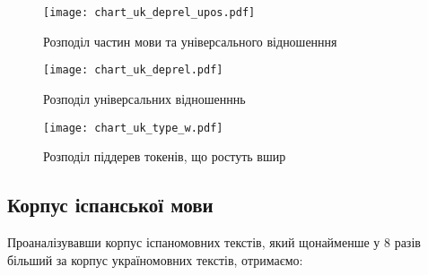 \begin{figure}[ht]
  \begin{center}
    \texttt{[image: chart\_uk\_deprel\_upos.pdf]}
  \end{center}
  \caption{Розподіл частин мови та універсального відношенння}
  \label{img:uk_deprel_upos}
\end{figure}

\newpage

\begin{multicols}{2}
\begin{figure}[H]
  \begin{center}
    \texttt{[image: chart\_uk\_deprel.pdf]}
  \end{center}
  \caption{Розподіл універсальних відношенннь}
  \label{img:uk0}
\end{figure}

\begin{figure}[H]
  \begin{center}
    \texttt{[image: chart\_uk\_type\_w.pdf]}
  \end{center}
  \caption{Розподіл піддерев токенів, що ростуть вшир}
  \label{img:uk3}
\end{figure}

\end{multicols}

\newpage

\subsection{Корпус іспанської мови}
Проаналізувавши корпус іспаномовних текстів, який щонайменше у 8 разів
більший за корпус україномовних текстів, отримаємо:

